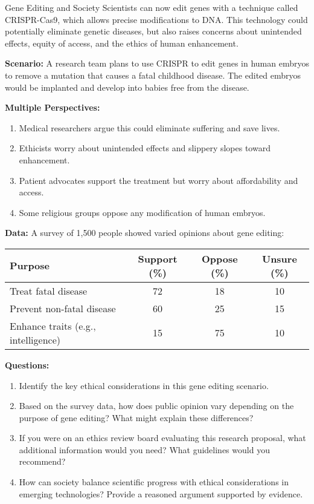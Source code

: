 \begin{pisascenario}{Gene Editing and Society}
Scientists can now edit genes with a technique called CRISPR-Cas9, which allows precise modifications to DNA. This technology could potentially eliminate genetic diseases, but also raises concerns about unintended effects, equity of access, and the ethics of human enhancement.

\textbf{Scenario:} A research team plans to use CRISPR to edit genes in human embryos to remove a mutation that causes a fatal childhood disease. The edited embryos would be implanted and develop into babies free from the disease.

\textbf{Multiple Perspectives:}
\begin{enumerate}
    \item Medical researchers argue this could eliminate suffering and save lives.
    \item Ethicists worry about unintended effects and slippery slopes toward enhancement.
    \item Patient advocates support the treatment but worry about affordability and access.
    \item Some religious groups oppose any modification of human embryos.
\end{enumerate}

\textbf{Data:} A survey of 1,500 people showed varied opinions about gene editing:
\begin{center}
\begin{tabular}{|l|c|c|c|}
\hline
\textbf{Purpose} & \textbf{Support (\%)} & \textbf{Oppose (\%)} & \textbf{Unsure (\%)} \\
\hline
Treat fatal disease & 72 & 18 & 10 \\
\hline
Prevent non-fatal disease & 60 & 25 & 15 \\
\hline
Enhance traits (e.g., intelligence) & 15 & 75 & 10 \\
\hline
\end{tabular}
\end{center}

\textbf{Questions:}
\begin{enumerate}
    \item Identify the key ethical considerations in this gene editing scenario.
    \item Based on the survey data, how does public opinion vary depending on the purpose of gene editing? What might explain these differences?
    \item If you were on an ethics review board evaluating this research proposal, what additional information would you need? What guidelines would you recommend?
    \item How can society balance scientific progress with ethical considerations in emerging technologies? Provide a reasoned argument supported by evidence.
\end{enumerate}
\end{pisascenario}

